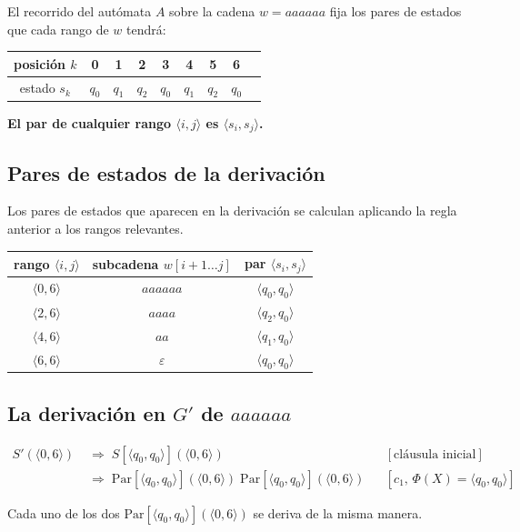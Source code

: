 \documentclass[11pt, letterpaper]{article}
\theoremstyle{definition}
\newcommand{\eps}{\varepsilon}
\newcommand{\pair}[2]{\langle #1, #2 \rangle}
\newcommand{\Par}{\mathrm{Par}}
\begin{document}
El recorrido del autómata $A$ sobre la cadena $w = aaaaaa$ fija los pares de estados que cada rango de $w$ tendrá:

\begin{center}
\begin{tabular}{c|cccccccc}
posición $k$       & 0   & 1   & 2   & 3   & 4   & 5   & 6   \\
\hline
estado $s_k$       & $q_0$ & $q_1$ & $q_2$ & $q_0$ & $q_1$ & $q_2$ & $q_0$
\end{tabular}
\end{center}

\textbf{El par de cualquier rango $\pair{i}{j}$ es $\pair{s_i}{s_j}$.}

\subsection{Pares de estados de la derivación}

Los pares de estados que aparecen en la derivación se calculan aplicando la regla anterior a los rangos relevantes.

\begin{center}
\begin{tabular}{c|c|c}
rango $\pair{i}{j}$ & subcadena $w[i+1 \ldots j]$ & par $\pair{s_i}{s_j}$ \\
\hline
$\pair{0}{6}$ & $aaaaaa$ & $\pair{q_0}{q_0}$ \\
$\pair{2}{6}$ & $aaaa$   & $\pair{q_2}{q_0}$ \\
$\pair{4}{6}$ & $aa$     & $\pair{q_1}{q_0}$ \\
$\pair{6}{6}$ & $\eps$   & $\pair{q_0}{q_0}$
\end{tabular}
\end{center}

\subsection{La derivación en $G'$ de $aaaaaa$}

\begin{align*}
S'(\pair{0}{6}) \;&\Rightarrow\; S[\pair{q_0}{q_0}](\pair{0}{6})
   && [\text{cláusula inicial}] \\
                \;&\Rightarrow\; \Par[\pair{q_0}{q_0}](\pair{0}{6}) \; \Par[\pair{q_0}{q_0}](\pair{0}{6})
   && [c_1\text{, } \Phi(X)=\pair{q_0}{q_0}]
\end{align*}

Cada uno de los dos $\Par[\pair{q_0}{q_0}](\pair{0}{6})$ se deriva de la misma manera.
\end{document}
